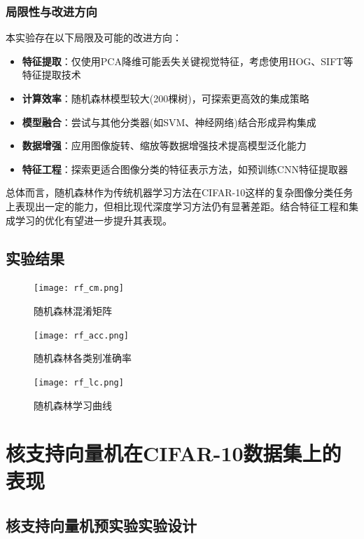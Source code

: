 \documentclass[UTF8]{report}
\theoremstyle{MyLineTheoremStyle} %
\theoremstyle{MyBlockTheoremStyle} %
\theoremstyle{MySubsubsectionStyle} %
\begin{document}
\subsubsection{局限性与改进方向}
本实验存在以下局限及可能的改进方向：
\begin{itemize}
    \item \textbf{特征提取}：仅使用PCA降维可能丢失关键视觉特征，考虑使用HOG、SIFT等特征提取技术
    \item \textbf{计算效率}：随机森林模型较大(200棵树)，可探索更高效的集成策略
    \item \textbf{模型融合}：尝试与其他分类器(如SVM、神经网络)结合形成异构集成
    \item \textbf{数据增强}：应用图像旋转、缩放等数据增强技术提高模型泛化能力
    \item \textbf{特征工程}：探索更适合图像分类的特征表示方法，如预训练CNN特征提取器
\end{itemize}

总体而言，随机森林作为传统机器学习方法在CIFAR-10这样的复杂图像分类任务上表现出一定的能力，但相比现代深度学习方法仍有显著差距。结合特征工程和集成学习的优化有望进一步提升其表现。

\subsection{实验结果}

\begin{figure}[H]
    \centering
    \texttt{[image: rf\_cm.png]}
    \caption{随机森林混淆矩阵}
    \label{fig:rf_confusion_matrix}
\end{figure}

\begin{figure}[H]
    \centering
    \texttt{[image: rf\_acc.png]}
    \caption{随机森林各类别准确率}
    \label{fig:rf_class_accuracy}
\end{figure}

\begin{figure}[H]
    \centering
    \texttt{[image: rf\_lc.png]}
    \caption{随机森林学习曲线}
    \label{fig:rf_learning_curve}
\end{figure}





\section{核支持向量机在CIFAR-10数据集上的表现}

\subsection{核支持向量机预实验实验设计}
\end{document}
